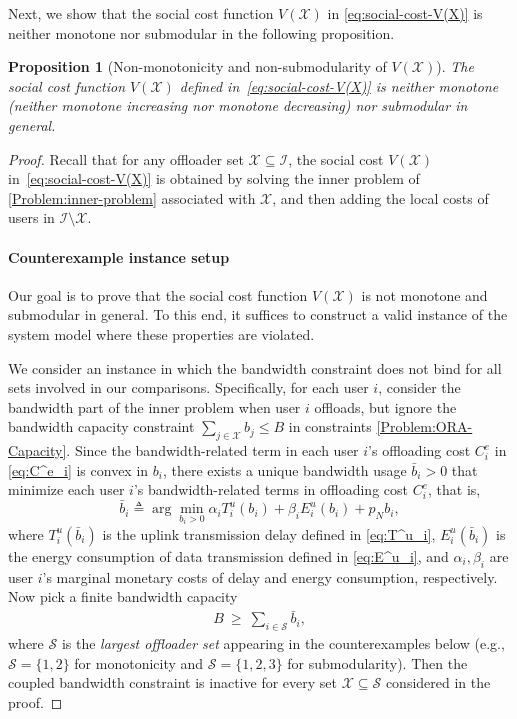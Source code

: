 \documentclass[lettersize,journal]{IEEEtran}
\newtheorem{proposition}{Proposition}
\begin{document}
Next, we show that the social cost function $V(\mathcal{X})$ in \eqref{eq:social-cost-V(X)} is neither monotone nor submodular in the following proposition.

\begin{proposition}[Non-monotonicity and non-submodularity of $V(\mathcal{X})$]
\label{prop:V-nonmono-nonsub}
The social cost function $V(\mathcal{X})$ defined in~\eqref{eq:social-cost-V(X)} is neither monotone (neither monotone increasing nor monotone decreasing) nor submodular in general.
\end{proposition}

\begin{proof}
Recall that for any offloader set $\mathcal{X}\subseteq\mathcal{I}$, the social cost $V(\mathcal{X})$ in~\eqref{eq:social-cost-V(X)} is obtained by solving the inner problem of \eqref{Problem:inner-problem} associated with $\mathcal{X}$, and then adding the local costs of users in $\mathcal{I}\setminus\mathcal{X}$.

\paragraph{Counterexample instance setup}
Our goal is to prove that the social cost function $V(\mathcal{X})$ is not monotone and submodular in general. To this end, it suffices to construct a valid instance of the system model where these properties are violated.

We consider an instance in which the bandwidth constraint does not bind for all sets involved in our comparisons. Specifically, for each user $i$, consider the bandwidth part of the inner problem when user $i$ offloads, but ignore the bandwidth capacity constraint $\sum_{j\in\mathcal{X}} b_j\le B$ in constraints \eqref{Problem:ORA-Capacity}. Since the bandwidth-related term in each user $i$'s offloading cost $C^e_i$ in \eqref{eq:C^e_i} is convex in $b_i$, there exists a unique bandwidth usage $\bar b_i>0$ that minimize each user $i$'s bandwidth-related terms in offloading cost $C^e_i$, that is,
\begin{equation}
    \bar b_i\triangleq \arg\min_{b_i>0}
\alpha_i T_i^{u}(b_i)+\beta_i E_i^{u}(b_i)+p_N b_i, \label{eq:def-bi-bar}
\end{equation}
where $T^u_i(\bar b_i)$ is the uplink transmission delay defined in \eqref{eq:T^u_i}, $E^u_i(\bar b_i)$ is the energy consumption of data transmission defined in \eqref{eq:E^u_i}, and $\alpha_i,\beta_i$ are user $i$'s marginal monetary costs of delay and energy consumption, respectively.
Now pick a finite bandwidth capacity
\begin{align}
B \ \ge\ \sum_{i\in \mathcal{S}} \bar b_i,
\label{eq:B-nonbinding}
\end{align}
where $\mathcal{S}$ is the \emph{largest offloader set} appearing in the counterexamples below (e.g., $\mathcal{S}=\{1,2\}$ for monotonicity and $\mathcal{S}=\{1,2,3\}$ for submodularity).
Then the coupled bandwidth constraint is inactive for every set $\mathcal{X}\subseteq \mathcal{S}$ considered in the proof.


\end{proof}
\end{document}
